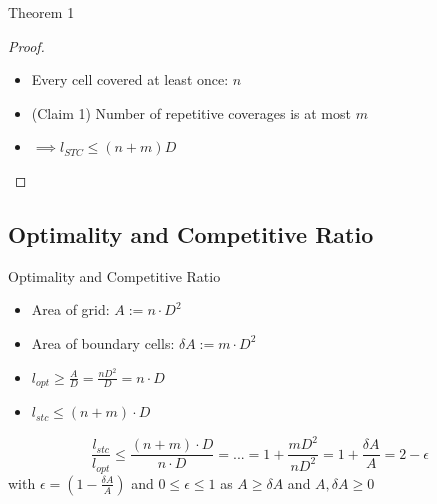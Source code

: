 \documentclass{beamer}
\begin{document}
\begin{frame}{Theorem 1}
    \begin{proof}
        \begin{itemize}
            \item Every cell covered at least once: $n$
            \item (Claim 1) Number of repetitive coverages is at most $m$
            \item $\implies l_{STC} \leq (n+m) D$
        \end{itemize}
    \end{proof}
\end{frame}

\subsection{Optimality and Competitive Ratio}
\begin{frame}{Optimality and Competitive Ratio}
    \begin{itemize}
        \item Area of grid: $A := n \cdot D^2$
        \item Area of boundary cells: $\delta A := m \cdot D^2$
        \item $l_{opt} \geq \frac{A}{D} = \frac{nD^2}{D} = n \cdot D$
        \item $l_{stc} \leq (n + m) \cdot D$
    \end{itemize}

    $$ \frac{l_{stc}}{l_{opt}} \leq \frac{(n+m) \cdot D}{n \cdot D} = ... = 1 + \frac{mD^2}{nD^2} = 1 + \frac{\delta A}{A} = 2 - \epsilon$$
    with $\epsilon = (1 - \frac{\delta A}{A})$ and $0 \leq \epsilon \leq 1$ as $A \geq \delta A$ and $A, \delta A \geq 0$
\end{frame}
\end{document}
